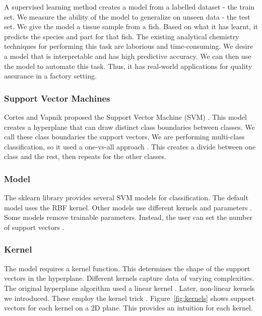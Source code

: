 \documentclass[runningheads]{llncs}
\begin{document}
A supervised learning method creates a model from a labelled dataset - the train set.
We measure the ability of the model to generalize on unseen data - the test set.
We give the model a tissue sample from a fish.
Based on what it has learnt, it predicts the species and part for that fish.
The existing analytical chemistry techniques for performing this task are laborious and time-consuming.
We desire a model that is interpretable and has high predictive accuracy.
We can then use the model to automate this task.
Thus, it has real-world applications for quality assurance in a factory setting.

\subsubsection{Support Vector Machines}
\label{sec:background-svm}

Cortes and Vapnik proposed the Support Vector Machine (SVM) \cite{cortes1995support}.
This model creates a hyperplane that can draw distinct class boundaries between classes.
We call these class boundaries the support vectors.
We are performing multi-class classification, so it used a one-vs-all approach \cite{sklearn2021feature}.
This creates a divide between one class and the rest, then repeats for the other classes.

\subsubsection{Model}
\label{sec:background-svm-model}

The sklearn library provides several SVM models for classification.
The default model uses the RBF kernel.
Other models use different kernels and parameters \cite{sklearn2021feature}.
Some models remove trainable parameters.
Instead, the user can set the number of support vectors \cite{scholkopf2000new}.

\subsubsection{Kernel}
\label{sec:background-svm-kernel}

The model requires a kernel function.
This determines the shape of the support vectors in the hyperplane.
Different kernels capture data of varying complexities.
The original hyperplane algorithm used a linear kernel \cite{aizerman1964theoretical}.
Later, non-linear kernels we introduced.
These employ the kernel trick \cite{boser1992training}.
Figure~\ref{fig:kernels} shows support vectors for each kernel on a 2D plane.
This provides an intuition for each kernel.
\end{document}

